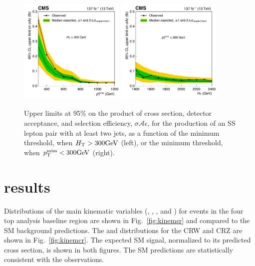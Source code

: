 \begin{figure}[!hbtp]
\centering
\includegraphics[width=0.45\textwidth]{figs/ssp/scan_milimits_met.pdf}
\includegraphics[width=0.45\textwidth]{figs/ssp/scan_milimits_ht.pdf}
\caption{Upper limits at 95\% \CL on the product of cross section, detector acceptance, and selection efficiency, $\sigma \! \mathcal{A} \epsilon$,
for the production of an SS lepton pair with at least two jets, as a function of the minimum \ptmiss threshold, when $H_{\mathrm{T}}>300\text{GeV}$ (left), or the minimum \HT threshold, when $p_{\mathrm{T}}^\text{miss}<300\text{GeV}$ (right).
    }
\label{fig:milimits}
\end{figure}



\section{\smft results}
\label{sec:ftresults}

Distributions of the main kinematic variables (\Njets, \Nbjets, \HT, and
\ptmiss) for events in the four top analysis baseline region are shown in Fig.~\ref{fig:kinemsr} and compared
to the SM background predictions. The \Njets and \Nbjets distributions for
the CRW and CRZ are shown in Fig.~\ref{fig:kinemcr}. The expected SM \tttt
signal, normalized to its predicted cross section, is shown in both figures.
The SM predictions are statistically consistent with the observations.

